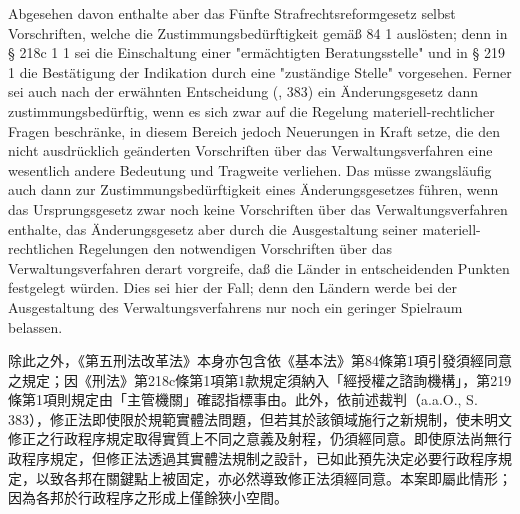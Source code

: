 \documentclass[12pt]{article}
\begin{document}
\syncleft
\begin{sourcepara}
Abgesehen davon enthalte aber das Fünfte Strafrechtsreformgesetz selbst Vorschriften, welche die Zustimmungsbedürftigkeit gemäß \abbrArt{} 84 \abbrAbs{} 1 \abbrGG{}\ggfnArtEightFourOneDE{} auslösten; denn in § 218c \abbrAbs{} 1 \abbrNr{} 1 \abbrStGB{} sei die Einschaltung einer "ermächtigten Beratungsstelle" und in § 219 \abbrAbs{} 1 \abbrStGB{} die Bestätigung der Indikation durch eine "zuständige Stelle" vorgesehen. Ferner sei auch nach der erwähnten Entscheidung (\abbrAAO{}, \abbrS{} 383) ein Änderungsgesetz dann zustimmungsbedürftig, wenn es sich zwar auf die Regelung materiell-rechtlicher Fragen beschränke, in diesem Bereich jedoch Neuerungen in Kraft setze, die den nicht ausdrücklich geänderten Vorschriften über das Verwaltungsverfahren eine wesentlich andere Bedeutung und Tragweite verliehen. Das müsse zwangsläufig auch dann zur Zustimmungsbedürftigkeit eines Änderungsgesetzes führen, wenn das Ursprungsgesetz zwar noch keine Vorschriften über das Verwaltungsverfahren enthalte, das Änderungsgesetz aber durch die Ausgestaltung seiner materiell-rechtlichen Regelungen den notwendigen Vorschriften über das Verwaltungsverfahren derart vorgreife, daß die Länder in entscheidenden Punkten festgelegt würden. Dies sei hier der Fall; denn den Ländern werde bei der Ausgestaltung des Verwaltungsverfahrens nur noch ein geringer Spielraum belassen.
\end{sourcepara}
\begin{transpara}
除此之外，《第五刑法改革法》本身亦包含依《基本法》第84條第1項\ggfnArtEightFourOneZH{}引發須經同意之規定；因《刑法》第218c條第1項第1款規定須納入「經授權之諮詢機構」，第219條第1項則規定由「主管機關」確認指標事由。此外，依前述裁判（a.a.O., S. 383），修正法即使限於規範實體法問題，但若其於該領域施行之新規制，使未明文修正之行政程序規定取得實質上不同之意義及射程，仍須經同意。即使原法尚無行政程序規定，但修正法透過其實體法規制之設計，已如此預先決定必要行政程序規定，以致各邦在關鍵點上被固定，亦必然導致修正法須經同意。本案即屬此情形；因為各邦於行政程序之形成上僅餘狹小空間。
\end{transpara}
\end{document}
